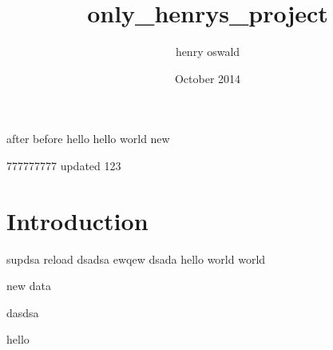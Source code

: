\documentclass{article}
\title{only_henrys_project}
\author{henry oswald}
\date{October 2014}
\begin{document}
\maketitle
after
before
hello
hello world
new

777777777
updated
123
\section{Introduction}
supdsa
reload
dsadsa
ewqew
dsada
hello world
world

new data

dasdsa

hello
\end{document}
